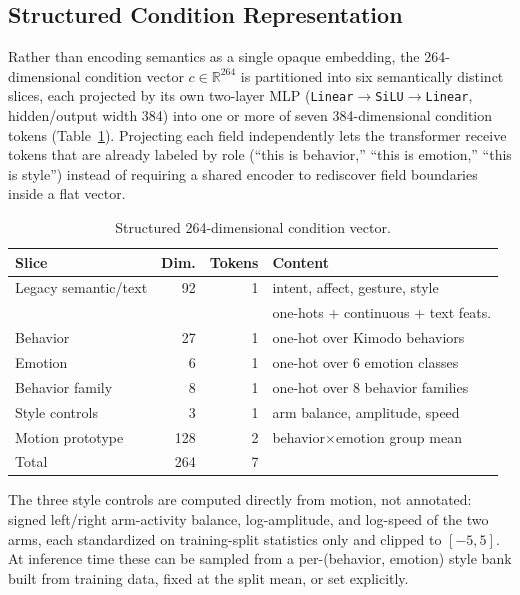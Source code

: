 \documentclass[conference]{IEEEtran}
\begin{document}
\subsection{Structured Condition Representation}
\label{sec:condition}

Rather than encoding semantics as a single opaque embedding, the
264-dimensional condition vector $c \in \mathbb{R}^{264}$ is partitioned
into six semantically distinct slices, each projected by its own
two-layer MLP (\texttt{Linear}$\to$\texttt{SiLU}$\to$\texttt{Linear},
hidden/output width 384) into one or more of seven 384-dimensional
condition tokens (Table~\ref{tab:condition}). Projecting each field
independently lets the transformer receive tokens that are already
labeled by role (``this is behavior,'' ``this is emotion,'' ``this is
style'') instead of requiring a shared encoder to rediscover field
boundaries inside a flat vector.

\begin{table}[t]
\centering
\caption{Structured 264-dimensional condition vector.}
\label{tab:condition}
\begin{tabular}{@{}lrrl@{}}
\toprule
Slice & Dim. & Tokens & Content \\
\midrule
Legacy semantic/text & 92 & 1 & intent, affect, gesture, style \\
 & & & one-hots + continuous + text feats. \\
Behavior & 27 & 1 & one-hot over Kimodo behaviors \\
Emotion & 6 & 1 & one-hot over 6 emotion classes \\
Behavior family & 8 & 1 & one-hot over 8 behavior families \\
Style controls & 3 & 1 & arm balance, amplitude, speed \\
Motion prototype & 128 & 2 & behavior$\times$emotion group mean \\
\midrule
Total & 264 & 7 & \\
\bottomrule
\end{tabular}
\end{table}

The three style controls are computed directly from motion, not
annotated: signed left/right arm-activity balance, log-amplitude, and
log-speed of the two arms, each standardized on training-split
statistics only and clipped to $[-5,5]$. At inference time these can be
sampled from a per-(behavior, emotion) style bank built from training
data, fixed at the split mean, or set explicitly.
\end{document}
